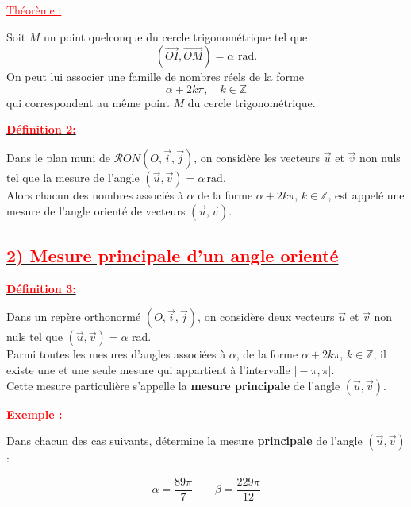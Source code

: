 \documentclass[a4paper,12pt]{article}
\begin{document}
\vspace{1em}

\noindent

\textcolor{red}{\underline{Théorème :}}

\vspace{0.5em}

Soit \( M \) un point quelconque du cercle trigonométrique tel que
\[
    (\overrightarrow{OI}, \overrightarrow{OM}) = \alpha \text{ rad}.
\]
On peut lui associer une famille de nombres réels de la forme
\[
    \alpha + 2k\pi, \quad k \in \mathbb{Z}
\]
qui correspondent au même point \( M \) du cercle trigonométrique.

\vspace{1em}
\noindent\textbf{\underline{\textcolor{red}{Définition 2:}}}

Dans le plan muni de \( \mathcal{R}ON(O, \vec{i}, \vec{j}) \), on considère les vecteurs \( \vec{u} \) et \( \vec{v} \) non nuls tel que la mesure de l’angle \( (\vec{u}, \vec{v}) = \alpha \, \text{rad} \).\\
Alors chacun des nombres associés à \( \alpha \) de la forme \( \alpha + 2k\pi \), \( k \in \mathbb{Z} \), est appelé une mesure de l’angle orienté de vecteurs \( (\vec{u}, \vec{v}) \).
\subsection*{\underline{\textcolor{red}{2) Mesure principale d’un angle orienté}}}

\textbf{\underline{\textcolor{red}{Définition 3:}}}

Dans un repère orthonormé \( (O, \vec{i}, \vec{j}) \), on considère deux vecteurs \( \vec{u} \) et \( \vec{v} \) non nuls tel que \( (\vec{u}, \vec{v}) = \alpha \) rad.\\
Parmi toutes les mesures d’angles associées à \( \alpha \), de la forme \( \alpha + 2k\pi \), \( k \in \mathbb{Z} \), il existe une et une seule mesure qui appartient à l’intervalle \( ]-\pi, \pi] \).\\
Cette mesure particulière s’appelle la \textbf{mesure principale} de l’angle \( (\vec{u}, \vec{v}) \).

\vspace{1em}

\textcolor{red}{\textbf{Exemple :}}

Dans chacun des cas suivants, détermine la mesure \textbf{principale} de l’angle \( (\vec{u}, \vec{v}) \) :

\[
    \alpha = \dfrac{89\pi}{7} \qquad \beta = \dfrac{229\pi}{12}
\]
\end{document}
